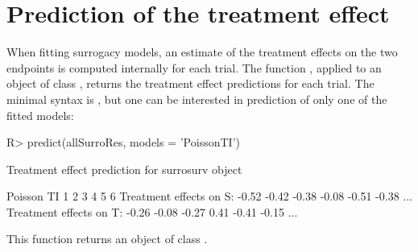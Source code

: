 \documentclass[article,shortnames, nojss]{jss}\usepackage[]{graphicx}\usepackage[]{color}
\begin{document}
\section{Prediction of the treatment effect}
When fitting surrogacy models,
  an estimate of the treatment effects on the two endpoints
  is computed internally for each trial.
The function , applied to an object of class ,
  returns the treatment effect predictions
  for each trial.
The minimal syntax is ,
  but one can be interested in prediction of only one of the fitted models:
\begin{Schunk}
\begin{Sinput}
R>   predict(allSurroRes, models = 'PoissonTI')
\end{Sinput}
\begin{Soutput}
Treatment effect prediction for surrosurv object

   Poisson TI 
                            1     2     3     4     5     6        
    Treatment effects on S: -0.52 -0.42 -0.38 -0.08 -0.51 -0.38 ...
    Treatment effects on T: -0.26 -0.08 -0.27  0.41 -0.41 -0.15 ...
\end{Soutput}
\end{Schunk}
This function returns an object of class .
\end{document}
